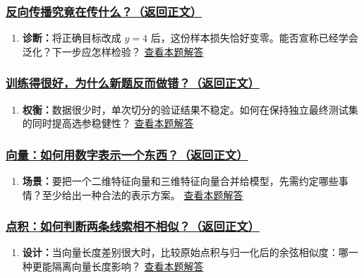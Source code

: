 \subsubsection*{\hyperref[check:18b-end-to-end-learning]{反向传播究竟在传什么？（返回正文）}}\begin{enumerate}[label={},leftmargin=4.8em,itemsep=4pt]
\item[\textbf{C4-8.}] \label{exercise:C4-8}\label{extension:18b-end-to-end-learning:4}\textbf{诊断：}将正确目标改成 $y=4$ 后，这份样本损失恰好变零。能否宣称已经学会泛化？下一步应怎样检验？ \hyperref[answerpiece:18b-end-to-end-learning:4]{查看本题解答}
\end{enumerate}

\subsubsection*{\hyperref[check:18-generalization]{训练得很好，为什么新题反而做错？（返回正文）}}\begin{enumerate}[label={},leftmargin=4.8em,itemsep=4pt]
\item[\textbf{C4-9.}] \label{exercise:C4-9}\label{extension:18-generalization:4}\textbf{权衡：}数据很少时，单次切分的验证结果不稳定。如何在保持独立最终测试集的同时提高选参稳健性？ \hyperref[answerpiece:18-generalization:4]{查看本题解答}
\end{enumerate}

\subsubsection*{\hyperref[check:01-vectors]{向量：如何用数字表示一个东西？（返回正文）}}\begin{enumerate}[label={},leftmargin=4.8em,itemsep=4pt]
\item[\textbf{C4-10.}] \label{exercise:C4-10}\label{extension:01-vectors:4}\textbf{场景：}要把一个二维特征向量和三维特征向量合并给模型，先需约定哪些事情？至少给出一种合法的表示方案。 \hyperref[answerpiece:01-vectors:4]{查看本题解答}
\end{enumerate}

\subsubsection*{\hyperref[check:02-dot-product]{点积：如何判断两条线索相不相似？（返回正文）}}\begin{enumerate}[label={},leftmargin=4.8em,itemsep=4pt]
\item[\textbf{C4-11.}] \label{exercise:C4-11}\label{extension:02-dot-product:4}\textbf{设计：}当向量长度差别很大时，比较原始点积与归一化后的余弦相似度：哪一种更能隔离向量长度影响？ \hyperref[answerpiece:02-dot-product:4]{查看本题解答}
\end{enumerate}

